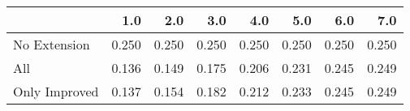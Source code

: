 \begin{tabular}{lrrrrrrr}
\toprule
{} &   1.0 &   2.0 &   3.0 &   4.0 &   5.0 &   6.0 &   7.0 \\
\midrule
No Extension  & 0.250 & 0.250 & 0.250 & 0.250 & 0.250 & 0.250 & 0.250 \\
All           & 0.136 & 0.149 & 0.175 & 0.206 & 0.231 & 0.245 & 0.249 \\
Only Improved & 0.137 & 0.154 & 0.182 & 0.212 & 0.233 & 0.245 & 0.249 \\
\bottomrule
\end{tabular}
